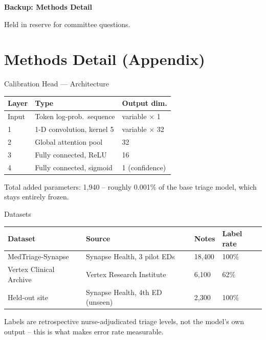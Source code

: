 \appendix

\begin{frame}[plain]
  \begin{center}
    \vspace{1.4cm}
    {\color{navy}\Large\bfseries Backup: Methods Detail}\par
    \vspace{0.3cm}
    {\small\color{slate} Held in reserve for committee questions.}
  \end{center}
\end{frame}

\section{Methods Detail (Appendix)}

\begin{frame}{Calibration Head --- Architecture}
  \begin{table}
    \centering
    \small
    \begin{tabular}{lll}
      \toprule
      \textbf{Layer} & \textbf{Type} & \textbf{Output dim.} \\
      \midrule
      Input & Token log-prob.\ sequence & variable $\times$ 1 \\
      1 & 1-D convolution, kernel 5 & variable $\times$ 32 \\
      2 & Global attention pool & 32 \\
      3 & Fully connected, ReLU & 16 \\
      4 & Fully connected, sigmoid & 1 (confidence) \\
      \bottomrule
    \end{tabular}
  \end{table}
  \par\vspace{6pt}
  \footnotesize\color{slate}
  Total added parameters: 1{,}940 -- roughly 0.001\% of the base triage
  model, which stays entirely frozen.
\end{frame}

\begin{frame}{Datasets}
  \begin{table}
    \centering
    \small
    \begin{tabular}{p{2.6cm}p{3.4cm}p{1.4cm}p{1.9cm}}
      \toprule
      \textbf{Dataset} & \textbf{Source} & \textbf{Notes} & \textbf{Label rate} \\
      \midrule
      MedTriage-Synapse & Synapse Health, 3 pilot EDs & 18{,}400 & 100\% \\
      Vertex Clinical Archive & Vertex Research Institute & 6{,}100 & 62\% \\
      Held-out site & Synapse Health, 4th ED (unseen) & 2{,}300 & 100\% \\
      \bottomrule
    \end{tabular}
  \end{table}
  \par\vspace{6pt}
  \footnotesize\color{slate}
  Labels are retrospective nurse-adjudicated triage levels, not the
  model's own output -- this is what makes error rate measurable.
\end{frame}

